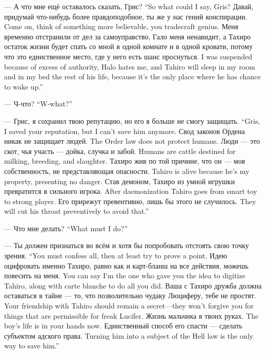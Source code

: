 {--- А что мне ещё оставалось сказать, Грис?}
{``So what could I say, Gris?}
{Давай, придумай что-нибудь более правдоподобное, ты же у нас гений конспирации.}
{Come on, think of something more believable, you tradecraft genius.}
{Меня временно отстранили от дел за самоуправство, Гало меня ненавидит, а Тахиро остаток жизни будет спать со мной в одной комнате и в одной кровати, потому что это единственное место, где у него есть шанс проснуться.}
{I was suspended because of excess of authority, Halo hates me, and Tahiro will sleep in my room and in my bed the rest of his life, because it's the only place where he has chance to wake up.''}

{--- Ч-что?}
{``W-what?''}

{--- Грис, я сохранил твою репутацию, но его я больше не смогу защищать.}
{``Gris, I saved your reputation, but I can't save him anymore.}
{Свод законов Ордена никак не защищает людей.}
{The Order law does not protect humans.}
{Люди --- это скот, чья участь --- дойка, случка и забой.}
{Humans are cattle destined for milking, breeding, and slaughter.}
{Тахиро жив по той причине, что он --- моя собственность, не представляющая опасности.}
{Tahiro is alive because he's my property, presenting no danger.}
{Став демоном, Тахиро из умной игрушки превратится в сильного игрока.}
{After daemonization Tahiro goes from smart toy to strong player.}
{Его прирежут превентивно, лишь бы этого не случилось.}
{They will cut his throat preventively to avoid that.''}

{--- Что мне делать?}
{``What must I do?''}

{--- Ты должен признаться во всём и хотя бы попробовать отстоять свою точку зрения.}
{``You must confess all, then at least try to prove a point.}
{Идею оцифровать именно Тахиро, равно как и карт-бланш на все действия, можешь повесить на меня.}
{You can say I'm the one who gave you the idea to digitize Tahiro, along with carte blanche to do all you did.}
{Ваша с Тахиро дружба должна оставаться в тайне --- то, что позволительно чудаку Люциферу, тебе не простят.}
{Your friendship with Tahiro should remain a secret---they won't forgive you for things that are permissible for freak Lucifer.}
{Жизнь мальчика в твоих руках.}
{The boy's life is in your hands now.}
{Единственный способ его спасти --- сделать субъектом адского права.}
{Turning him into a subject of the Hell law is the only way to save him.''}

